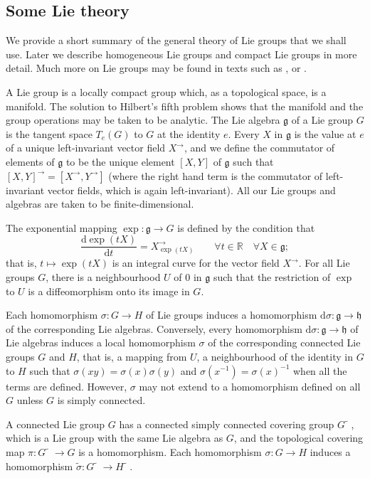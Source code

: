 \documentclass[12pt,twoside,a4paper]{amsart}
\theoremstyle{definition}
\theoremstyle{remark}
\numberwithin{equation}{section}
\newcommand{\R}{\mathbb{R}}
\newcommand{\Lie}[1]{\mathfrak{#1}}
\newcommand{\afterarrow}{^{\to}}
\newcommand{\aftertilde}{\tilde{\phantom{n}}}
\begin{document}


\subsection{Some Lie  theory}
We provide a short summary of the general theory of Lie groups that we shall use.
Later we describe homogeneous Lie groups and compact Lie groups in more detail.
Much more on Lie groups may be found in texts such as \cite{Knapp02}, \cite{Sep07} or \cite{Var84}.

A Lie group is a locally compact group which, as a topological space, is a manifold.
The solution to Hilbert's fifth problem shows that the manifold and the group operations may be taken to be analytic.
The Lie algebra $\Lie{g}$ of a Lie group $G$ is the tangent space $T_e(G)$ to $G$ at the identity $e$.
Every $X$ in $\Lie{g}$ is the value at $e$ of a unique left-invariant vector field $X\afterarrow $, and we define the commutator of elements of $\Lie{g}$ to be the unique element $[X,Y]$ of $\Lie{g}$ such that $ [X,Y]\afterarrow = [ X \afterarrow, Y \afterarrow ]$ (where the right hand term is the commutator of left-invariant vector fields, which is again left-invariant).
All our Lie groups and algebras are taken to be finite-dimensional.

The exponential mapping $\exp\colon  \Lie{g} \to G$ is defined by the condition that 
\[
\frac{ \mathrm{d} \exp(tX) }{\mathrm{d}t} = X\afterarrow_{\exp(tX)} 
\qquad\forall t \in \R \quad\forall X \in \Lie{g} ;
\]
that is, $t \mapsto \exp(tX)$ is an integral curve for the vector field $X \afterarrow$.
For all Lie groups $G$, there is a neighbourhood $U$ of $0$ in $\Lie{g}$ such that the restriction of $\exp$ to $U$ is a diffeomorphism onto its image in $G$.


Each homomorphism $\sigma\colon G \to H$ of Lie groups induces a homomorphism $\mathrm{d}\sigma\colon  \Lie{g} \to \Lie{h}$ of the corresponding Lie algebras.  
Conversely, every homomorphism $\mathrm{d}\sigma\colon  \Lie{g} \to \Lie{h}$ of Lie algebras induces a local homomorphism $\sigma$ of the corresponding connected Lie groups $G$ and $H$, that is, a mapping from $U$, a neighbourhood of the identity in $G$ to $H$ such that $\sigma(xy) = \sigma(x)\sigma(y)$ and $\sigma(x^{-1}) = \sigma(x)^{-1}$ when all the terms are defined.
However, $\sigma$ may not extend to a homomorphism defined on all $G$ unless $G$ is simply connected.

A connected Lie group $G$ has a connected simply connected covering group $G\aftertilde$, which is a Lie group with the same Lie algebra as $G$, and the topological covering map $\pi\colon  G\aftertilde \to G$ is a homomorphism.
Each homomorphism $\sigma\colon  G \to H$ induces a homomorphism $\tilde\sigma\colon  G \aftertilde \to H \aftertilde$.
\end{document}
